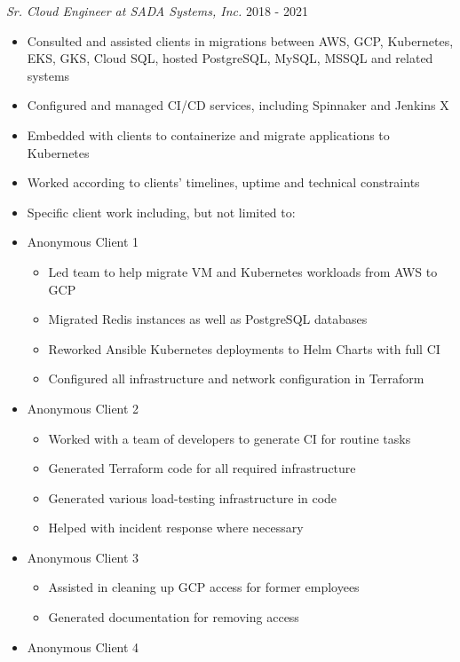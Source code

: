 \documentclass[line]{docs/resume/res}
\begin{document}
\begin{resume}
  {\sl Sr. Cloud Engineer at SADA Systems, Inc.} \hfill 2018 - 2021
  \begin{itemize} \itemsep -2pt
    \item Consulted and assisted clients in migrations between AWS, GCP, Kubernetes, \\
      EKS, GKS, Cloud SQL, hosted PostgreSQL, MySQL, MSSQL and related systems
    \item Configured and managed CI/CD services, including Spinnaker and Jenkins X
    \item Embedded with clients to containerize and migrate applications to Kubernetes
    \item Worked according to clients' timelines, uptime and technical constraints
    \item Specific client work including, but not limited to:
    \item Anonymous Client 1
    \begin{itemize} \itemsep -2pt
      \item Led team to help migrate VM and Kubernetes workloads from AWS to GCP
      \item Migrated Redis instances as well as PostgreSQL databases
      \item Reworked Ansible Kubernetes deployments to Helm Charts with full CI
      \item Configured all infrastructure and network configuration in Terraform
    \end{itemize}
    \item Anonymous Client 2
    \begin{itemize} \itemsep -2pt
      \item Worked with a team of developers to generate CI for routine tasks
      \item Generated Terraform code for all required infrastructure
      \item Generated various load-testing infrastructure in code
      \item Helped with incident response where necessary
    \end{itemize}
    \item Anonymous Client 3
    \begin{itemize} \itemsep -2pt
      \item Assisted in cleaning up GCP access for former employees
      \item Generated documentation for removing access
    \end{itemize}
    \item Anonymous Client 4

\end{itemize}
\end{resume}
\end{document}
